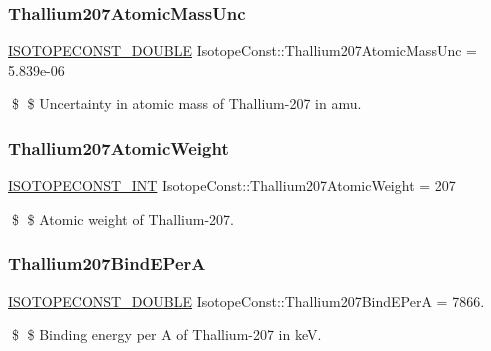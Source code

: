 \subsubsection{\texorpdfstring{Thallium207\+Atomic\+Mass\+Unc}{Thallium207AtomicMassUnc}}
{\footnotesize\ttfamily \mbox{\hyperlink{group___isotope_const-_macros_ga8f45a7272ce02c0b4c65c44636ed719a}{I\+S\+O\+T\+O\+P\+E\+C\+O\+N\+S\+T\+\_\+\+D\+O\+U\+B\+LE}} Isotope\+Const\+::\+Thallium207\+Atomic\+Mass\+Unc = 5.\+839e-\/06}

\$ \$ Uncertainty in atomic mass of Thallium-\/207 in amu. \mbox{\label{group___isotope_const-_thallium-_tl207_ga1ec60d5bb70ff241e5dbcb8d467f38f9}} 
\subsubsection{\texorpdfstring{Thallium207\+Atomic\+Weight}{Thallium207AtomicWeight}}
{\footnotesize\ttfamily \mbox{\hyperlink{group___isotope_const-_macros_ga5f18360b3e99483a35c32d789e62621c}{I\+S\+O\+T\+O\+P\+E\+C\+O\+N\+S\+T\+\_\+\+I\+NT}} Isotope\+Const\+::\+Thallium207\+Atomic\+Weight = 207}

\$ \$ Atomic weight of Thallium-\/207. \mbox{\label{group___isotope_const-_thallium-_tl207_gad49fe215728ec54c91809306cac23a86}} 
\subsubsection{\texorpdfstring{Thallium207\+Bind\+E\+PerA}{Thallium207BindEPerA}}
{\footnotesize\ttfamily \mbox{\hyperlink{group___isotope_const-_macros_ga8f45a7272ce02c0b4c65c44636ed719a}{I\+S\+O\+T\+O\+P\+E\+C\+O\+N\+S\+T\+\_\+\+D\+O\+U\+B\+LE}} Isotope\+Const\+::\+Thallium207\+Bind\+E\+PerA = 7866.}

\$ \$ Binding energy per A of Thallium-\/207 in keV. \mbox{\label{group___isotope_const-_thallium-_tl207_ga01a70b515d53fbf098fef17df94c6438}} 
